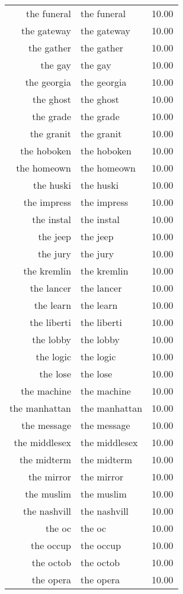 \begin{table}[ht]
\begin{tabular}{rlr}
  the funeral & the funeral & 10.00 \\ 
  the gateway & the gateway & 10.00 \\ 
  the gather & the gather & 10.00 \\ 
  the gay & the gay & 10.00 \\ 
  the georgia & the georgia & 10.00 \\ 
  the ghost & the ghost & 10.00 \\ 
  the grade & the grade & 10.00 \\ 
  the granit & the granit & 10.00 \\ 
  the hoboken & the hoboken & 10.00 \\ 
  the homeown & the homeown & 10.00 \\ 
  the huski & the huski & 10.00 \\ 
  the impress & the impress & 10.00 \\ 
  the instal & the instal & 10.00 \\ 
  the jeep & the jeep & 10.00 \\ 
  the jury & the jury & 10.00 \\ 
  the kremlin & the kremlin & 10.00 \\ 
  the lancer & the lancer & 10.00 \\ 
  the learn & the learn & 10.00 \\ 
  the liberti & the liberti & 10.00 \\ 
  the lobby & the lobby & 10.00 \\ 
  the logic & the logic & 10.00 \\ 
  the lose & the lose & 10.00 \\ 
  the machine & the machine & 10.00 \\ 
  the manhattan & the manhattan & 10.00 \\ 
  the message & the message & 10.00 \\ 
  the middlesex & the middlesex & 10.00 \\ 
  the midterm & the midterm & 10.00 \\ 
  the mirror & the mirror & 10.00 \\ 
  the muslim & the muslim & 10.00 \\ 
  the nashvill & the nashvill & 10.00 \\ 
  the oc & the oc & 10.00 \\ 
  the occup & the occup & 10.00 \\ 
  the octob & the octob & 10.00 \\ 
  the opera & the opera & 10.00 \\ 

\end{tabular}
\end{table}
